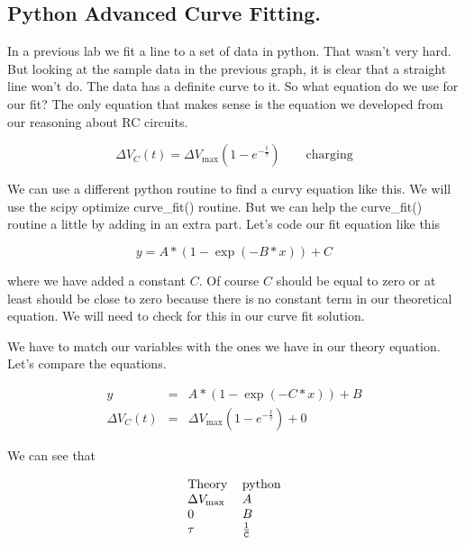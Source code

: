\subsection{Python Advanced Curve Fitting.}

In a previous lab we fit a line to a set of data in python. That wasn't very hard. But looking at the sample data in the previous graph, it is clear that a straight line won't do.  The data has a definite curve to it. So what equation do we use for our fit? The only equation that makes sense is the equation we developed from our reasoning about RC circuits.

\begin{equation*}
	\Delta V_{C}\left( t\right) =\Delta V_{\max }\left( 1-e^{-\frac{t}{\tau }}\right) \qquad \text{charging}
\end{equation*}

We can use a different python routine to find a curvy equation like this.  We will use the scipy optimize curve\_fit() routine. But we can help the curve\_fit() routine a little by adding in an extra part. Let's code our fit equation like this

\begin{equation*}
	y=A\ast (1-\exp (-B\ast x))+C
\end{equation*}

where we have added a constant $C$. Of course $C$ should be equal to zero or at least should be close to zero because there is no constant term in our theoretical equation. We will need to check for this in our curve fit solution. 



We have to match our variables with the ones we have in our theory equation. Let's compare the equations. 

\begin{eqnarray*}
	y &=&A\ast (1-\exp (-C\ast x))+B \\
	\Delta V_{C}\left( t\right) &=&\Delta V_{\max }\left( 1-e^{-\frac{t}{\tau }}\right) +0
\end{eqnarray*}

We can see that 

\begin{equation*}
	\begin{tabular}{ll}
	                Theory & python \\ 
		$\Delta V_{\max }$ & $A$ \\ 
	                   $0$ & $B$ \\ 
	               $\tau $ & $\frac{1}{\mathtt{C}}$%
	\end{tabular}
\end{equation*}

